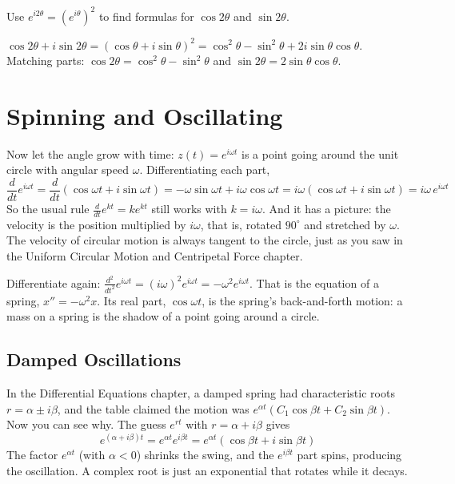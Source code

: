 \begin{Exercise}[title={Double Angles}, label=eu_double]
Use $e^{i2\theta} = \left(e^{i\theta}\right)^2$ to find formulas for $\cos 2\theta$ and
$\sin 2\theta$.
\end{Exercise}
\begin{Answer}[ref=eu_double]
$\cos 2\theta + i\sin 2\theta = (\cos\theta + i\sin\theta)^2 = \cos^2\theta - \sin^2\theta + 2i\sin\theta\cos\theta$.
Matching parts: $\cos 2\theta = \cos^2\theta - \sin^2\theta$ and $\sin 2\theta = 2\sin\theta\cos\theta$.
\end{Answer}

\section{Spinning and Oscillating}

Now let the angle grow with time: $z(t) = e^{i\omega t}$ is a point going around the
unit circle with angular speed $\omega$. Differentiating each part,
$$\frac{d}{dt}e^{i\omega t} = \frac{d}{dt}\left(\cos\omega t + i\sin\omega t\right) = -\omega\sin\omega t + i\omega\cos\omega t = i\omega\left(\cos\omega t + i\sin\omega t\right) = i\omega\, e^{i\omega t}$$
So the usual rule $\frac{d}{dt}e^{kt} = ke^{kt}$ still works with $k = i\omega$. And it
has a picture: the velocity is the position multiplied by $i\omega$, that is, rotated
$90^\circ$ and stretched by $\omega$. The velocity of circular motion is always
tangent to the circle, just as you saw in the Uniform Circular Motion and Centripetal Force chapter.

Differentiate again: $\frac{d^2}{dt^2}e^{i\omega t} = (i\omega)^2 e^{i\omega t} = -\omega^2 e^{i\omega t}$.
That is the equation of a spring, $x'' = -\omega^2 x$. Its real part, $\cos\omega t$,
is the spring's back-and-forth motion: a mass on a spring is the shadow of a point
going around a circle.

\subsection{Damped Oscillations}
In the Differential Equations chapter, a damped spring had characteristic roots
$r = \alpha \pm i\beta$, and the table claimed the motion was
$e^{\alpha t}(C_1\cos\beta t + C_2\sin\beta t)$. Now you can see why. The guess
$e^{rt}$ with $r = \alpha + i\beta$ gives
$$e^{(\alpha + i\beta)t} = e^{\alpha t}e^{i\beta t} = e^{\alpha t}\left(\cos\beta t + i\sin\beta t\right)$$
The factor $e^{\alpha t}$ (with $\alpha < 0$) shrinks the swing, and the
$e^{i\beta t}$ part spins, producing the oscillation. A complex root is just an
exponential that rotates while it decays.

